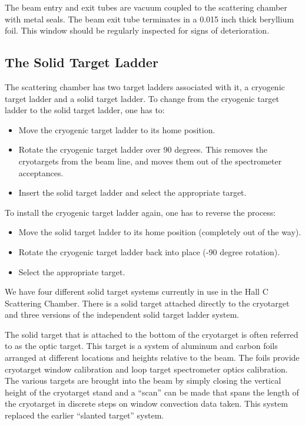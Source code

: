 The beam entry and exit tubes are vacuum coupled to the scattering chamber with
metal seals. The beam exit tube terminates in a 0.015 inch thick beryllium foil.
This window should be regularly inspected for signs of deterioration.


\subsection{The Solid Target Ladder}

The scattering chamber has two target ladders associated with it,
a cryogenic target ladder and a solid target ladder. To change
from the cryogenic target ladder to the solid target ladder, one has
to:

\begin{itemize}
\item{Move the cryogenic target ladder to its home position.}
\item{Rotate the cryogenic target ladder over 90 degrees. This removes
the cryotargets from the beam line, and moves them out of the spectrometer
acceptances.}
\item{Insert the solid target ladder and select the appropriate target.}
\end{itemize}

\noindent To install the cryogenic target ladder again, one has to reverse the
process:

\begin{itemize}
\item{Move the solid target ladder to its home position (completely out
of the way).}
\item{Rotate the cryogenic target ladder back into place (-90 degree
rotation).}
\item{Select the appropriate target.}
\end{itemize}

We have four different solid target systems currently in use in the
Hall C Scattering Chamber.  There is a solid target attached directly
to the cryotarget and three versions of the independent solid target
ladder system.

The solid target that is attached to the bottom of the cryotarget is
often referred to as the optic target.  This target is a system of
aluminum and carbon foils arranged at different locations and heights
relative to the beam.  The foils provide cryotarget window
calibration and loop target spectrometer optics calibration.  The
various targets are brought into the beam by simply closing the
vertical height of the cryotarget stand and a ``scan'' can be made
that spans the length of the cryotarget in discrete steps on window
convection data taken.  This system replaced the earlier ``slanted
target'' system.


